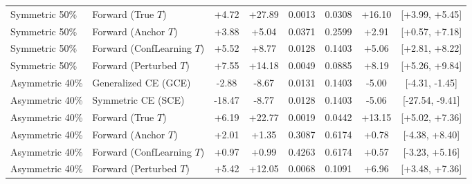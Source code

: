 \begin{table}[t]
\begin{tabular}{llcccccc}
Symmetric 50\% & Forward (True $T$) & +4.72 & +27.89 & 0.0013 & 0.0308 & +16.10 & [+3.99, +5.45] \\
Symmetric 50\% & Forward (Anchor $T$) & +3.88 & +5.04 & 0.0371 & 0.2599 & +2.91 & [+0.57, +7.18] \\
Symmetric 50\% & Forward (ConfLearning $T$) & +5.52 & +8.77 & 0.0128 & 0.1403 & +5.06 & [+2.81, +8.22] \\
Symmetric 50\% & Forward (Perturbed $T$) & +7.55 & +14.18 & 0.0049 & 0.0885 & +8.19 & [+5.26, +9.84] \\
\hline
Asymmetric 40\% & Generalized CE (GCE) & -2.88 & -8.67 & 0.0131 & 0.1403 & -5.00 & [-4.31, -1.45] \\
Asymmetric 40\% & Symmetric CE (SCE) & -18.47 & -8.77 & 0.0128 & 0.1403 & -5.06 & [-27.54, -9.41] \\
Asymmetric 40\% & Forward (True $T$) & +6.19 & +22.77 & 0.0019 & 0.0442 & +13.15 & [+5.02, +7.36] \\
Asymmetric 40\% & Forward (Anchor $T$) & +2.01 & +1.35 & 0.3087 & 0.6174 & +0.78 & [-4.38, +8.40] \\
Asymmetric 40\% & Forward (ConfLearning $T$) & +0.97 & +0.99 & 0.4263 & 0.6174 & +0.57 & [-3.23, +5.16] \\
Asymmetric 40\% & Forward (Perturbed $T$) & +5.42 & +12.05 & 0.0068 & 0.1091 & +6.96 & [+3.48, +7.36] \\
\hline
\end{tabular}
\end{table}
